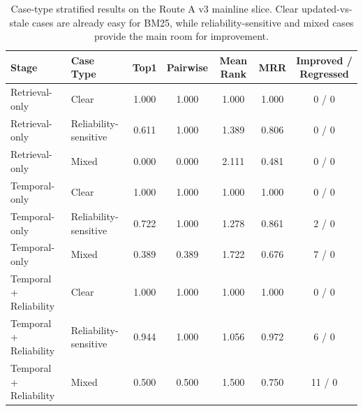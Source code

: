 \begin{table}[t]
\centering
\small
\begin{tabular}{llccccc}
\hline
Stage & Case Type & Top1 & Pairwise & Mean Rank & MRR & Improved / Regressed \\
\hline
Retrieval-only & Clear & 1.000 & 1.000 & 1.000 & 1.000 & 0 / 0 \\
Retrieval-only & Reliability-sensitive & 0.611 & 1.000 & 1.389 & 0.806 & 0 / 0 \\
Retrieval-only & Mixed & 0.000 & 0.000 & 2.111 & 0.481 & 0 / 0 \\
Temporal-only & Clear & 1.000 & 1.000 & 1.000 & 1.000 & 0 / 0 \\
Temporal-only & Reliability-sensitive & 0.722 & 1.000 & 1.278 & 0.861 & 2 / 0 \\
Temporal-only & Mixed & 0.389 & 0.389 & 1.722 & 0.676 & 7 / 0 \\
Temporal + Reliability & Clear & 1.000 & 1.000 & 1.000 & 1.000 & 0 / 0 \\
Temporal + Reliability & Reliability-sensitive & 0.944 & 1.000 & 1.056 & 0.972 & 6 / 0 \\
Temporal + Reliability & Mixed & 0.500 & 0.500 & 1.500 & 0.750 & 11 / 0 \\
\hline
\end{tabular}
\caption{Case-type stratified results on the Route A v3 mainline slice. Clear updated-vs-stale cases are already easy for BM25, while reliability-sensitive and mixed cases provide the main room for improvement.}
\label{tab:route_a_stratified}
\end{table}
